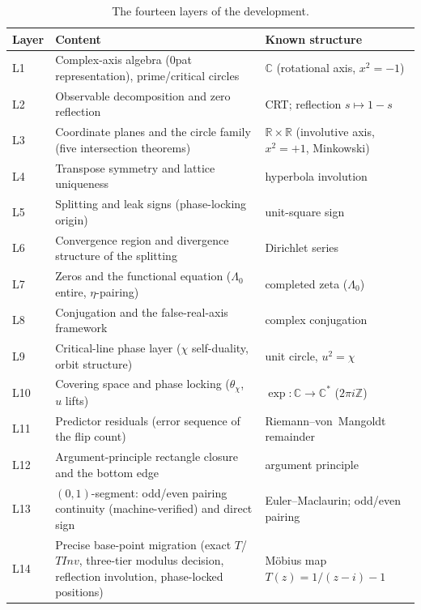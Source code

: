 \documentclass{article}
\newcommand{\Lam}{\Lambda}
\newcommand{\Xchi}{\chi}
\begin{document}
\begin{table}[h]
\centering
{\small
\caption{The fourteen layers of the development.}
\label{tab:layers}
\begin{tabular}{@{}l p{8.6cm} p{4.6cm}@{}}
\hline
Layer & Content & Known structure \\
\hline
L1 & Complex-axis algebra (0pat representation), prime/critical circles & $\mathbb C$ (rotational axis, $x^2=-1$) \\
L2 & Observable decomposition and zero reflection & CRT; reflection $s\mapsto1-s$ \\
L3 & Coordinate planes and the circle family (five intersection theorems) & $\mathbb R\times\mathbb R$ (involutive axis, $x^2=+1$, Minkowski) \\
L4 & Transpose symmetry and lattice uniqueness & hyperbola involution \\
L5 & Splitting and leak signs (phase-locking origin) & unit-square sign \\
L6 & Convergence region and divergence structure of the splitting & Dirichlet series \\
L7 & Zeros and the functional equation ($\Lam_0$ entire, $\eta$-pairing) & completed zeta ($\Lam_0$) \\
L8 & Conjugation and the false-real-axis framework & complex conjugation \\
L9 & Critical-line phase layer ($\Xchi$ self-duality, orbit structure) & unit circle, $u^2=\Xchi$ \\
L10 & Covering space and phase locking ($\theta_\Xchi$, $u$ lifts) & $\exp:\mathbb C\to\mathbb C^*$ ($2\pi i\mathbb Z$) \\
L11 & Predictor residuals (error sequence of the flip count) & Riemann--von~Mangoldt remainder \\
L12 & Argument-principle rectangle closure and the bottom edge & argument principle \\
L13 & $(0,1)$-segment: odd/even pairing continuity (machine-verified) and direct sign & Euler--Maclaurin; odd/even pairing \\
L14 & Precise base-point migration (exact $T$/$TInv$, three-tier modulus decision, reflection involution, phase-locked positions) & M\"obius map $T(z)=1/(z-i)-1$ \\
\hline
\end{tabular}
}
\end{table}
\end{document}
